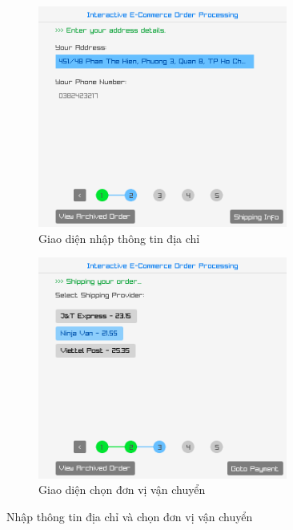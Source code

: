 \documentclass[a4paper,12pt]{report}
\begin{document}
\begin{figure}[!ht]
  \centering
  \begin{subfigure}{0.46\textwidth}
    \centering
    \includegraphics[width=0.9\textwidth]{../assets/screenshots/gui/address_info.png}
    \caption{Giao diện nhập thông tin địa chỉ}
  \end{subfigure}
  \hfill
  \begin{subfigure}{0.46\textwidth}
    \centering
    \includegraphics[width=0.9\textwidth]{../assets/screenshots/gui/shipping_provider.png}
    \caption{Giao diện chọn đơn vị vận chuyển}
  \end{subfigure}
  \caption{Nhập thông tin địa chỉ và chọn đơn vị vận chuyển}
\end{figure}
\end{document}
